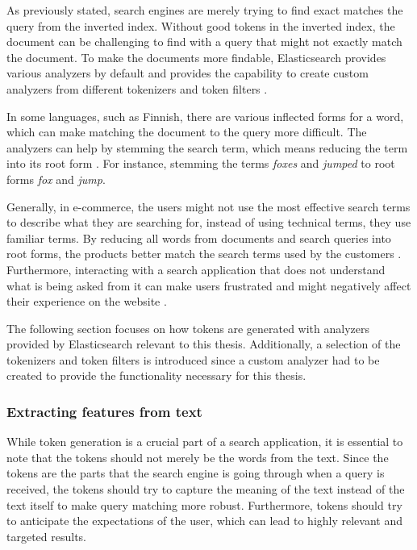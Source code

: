 As previously stated, search engines are merely trying to find exact matches the query from the
inverted index. 
Without good tokens in the inverted index,
the document can be challenging to find with a query that might not exactly match the document.
To make the documents more findable, Elasticsearch provides various analyzers by default and provides
the capability to create custom analyzers from different tokenizers and token filters 
\cite{relevantSearch}.


In some languages, such as Finnish, there are various inflected forms for a word, which can make
matching the document to the query more difficult.
The analyzers can help by stemming the search term, which means reducing the term into its root form \cite{relevantSearch}.
For instance, stemming the terms \emph{foxes} and \emph{jumped} to root forms \emph{fox} and \emph{jump}.


Generally, in e-commerce, the users might not use the most effective search terms to describe
what they are searching for, instead of using technical terms, they use familiar terms.
By reducing all words from documents and search queries into root forms, the products better match
the search terms used by the customers \cite{relevantSearch}.
Furthermore, interacting with a search application that does not understand what is being asked from it
can make users frustrated and might negatively affect their experience on the website \cite{relevantSearch}.

The following section focuses on 
how tokens are generated with analyzers provided by Elasticsearch relevant to this thesis.
Additionally, a selection of the tokenizers and token filters is introduced since a custom
analyzer had to be created to provide the functionality necessary for this thesis.

\subsubsection{Extracting features from text}
\label{ss:extrackingFeatures}

While token generation is a crucial part of a search application, it is essential to note that the tokens should not 
merely be the words from the text.
Since the tokens are the parts that the search engine is going through when a query is received, the tokens
should try to capture the meaning of the text instead of the text itself to make query matching more robust.
Furthermore, tokens should try to anticipate the expectations of the user, which can lead to 
highly relevant and targeted results.
\cite{relevantSearch}


